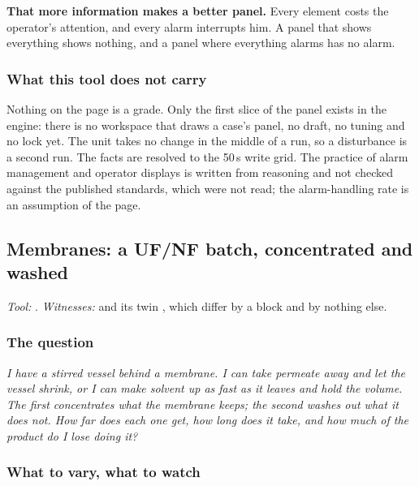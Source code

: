\documentclass[11pt,a4paper]{article}
\begin{document}
\begin{pitfall}
\textbf{That more information makes a better panel.}  Every element costs the
operator's attention, and every alarm interrupts him.  A panel that shows
everything shows nothing, and a panel where everything alarms has no alarm.
\end{pitfall}

\subsubsection*{What this tool does not carry}

Nothing on the page is a grade.  Only the first slice of the panel exists in
the engine: there is no workspace that draws a case's panel, no draft, no
tuning and no lock yet.  The unit takes no change in the middle of a run, so a
disturbance is a second run.  The facts are resolved to the 50\,s write grid.
The practice of alarm management and operator displays is written from
reasoning and not checked against the published standards, which were not
read; the alarm-handling rate is an assumption of the page.

\subsection{Membranes: a UF/NF batch, concentrated and washed}\label{sec:edu-batch-membrane}


\noindent\textit{\small Tool:} .  \textit{\small
Witnesses:}  and
its twin ,
which differ by a  block and by nothing else.

\subsubsection*{The question}

\emph{I have a stirred vessel behind a membrane.  I can take permeate away
and let the vessel shrink, or I can make solvent up as fast as it leaves
and hold the volume.  The first concentrates what the membrane keeps; the
second washes out what it does not.  How far does each one get, how long
does it take, and how much of the product do I lose doing it?}

\subsubsection*{What to vary, what to watch}
\end{document}
